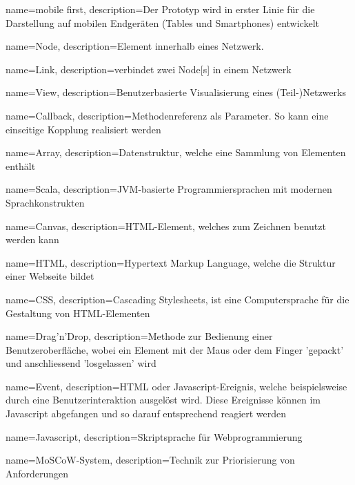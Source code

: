 {
    name=mobile first,
    description={Der Prototyp wird in erster Linie für die Darstellung auf mobilen Endgeräten (Tables und Smartphones) entwickelt}
}

{
    name=Node,
    description={Element innerhalb eines Netzwerk.}
}

{
    name=Link,
    description={verbindet zwei \gls{Node}[s] in einem Netzwerk}
}

{
    name=View,
    description={Benutzerbasierte Visualisierung eines (Teil-)Netzwerks}
}

{
    name=Callback,
    description={Methodenreferenz als Parameter. So kann eine einseitige Kopplung realisiert werden}
}

{
    name=Array,
    description={Datenstruktur, welche eine Sammlung von Elementen enthält}
}

{
    name=Scala,
    description={JVM-basierte Programmiersprachen mit modernen Sprachkonstrukten}
}

{
    name=Canvas,
    description={\gls{HTML}-Element, welches zum Zeichnen benutzt werden kann}
}

{
    name=HTML,
    description={Hypertext Markup Language, welche die Struktur einer Webseite bildet}
}

{
    name=CSS,
    description={Cascading Stylesheets, ist eine Computersprache für die Gestaltung von \gls{HTML}-Elementen}
}

{
    name=Drag'n'Drop,
    description={Methode zur Bedienung einer Benutzeroberfläche, wobei ein Element mit der Maus oder dem Finger 'gepackt' und anschliessend 'losgelassen' wird}
}

{
    name=Event,
    description={\gls{HTML} oder \gls{Javascript}-Ereignis, welche beispielsweise durch eine Benutzerinteraktion ausgelöst wird. Diese Ereignisse können im \gls{Javascript} abgefangen und so darauf entsprechend reagiert werden}
}

{
    name=Javascript,
    description={Skriptsprache für Webprogrammierung}
}

{
    name=MoSCoW-System,
    description={Technik zur Priorisierung von Anforderungen}
    \cite{moscow:hardvard}
}

